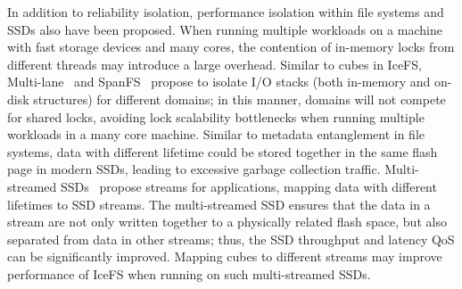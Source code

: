 In addition to reliability isolation, performance isolation within
file systems and SSDs also have been proposed. When running multiple
workloads on a machine with fast storage devices and many cores, the
contention of in-memory locks from different threads may introduce a
large overhead. Similar to cubes in IceFS,
Multi-lane~\cite{Kang14-multilane} and SpanFS~\cite{spanfs}  
propose to isolate I/O stacks (both in-memory and on-disk structures)
for different domains; in this manner, domains will not compete for
shared locks, avoiding lock scalability bottlenecks when running
multiple workloads in a many core machine.
Similar to metadata entanglement in file systems, data with different
lifetime could be stored together in the same flash page in modern
SSDs, leading to excessive garbage collection traffic. 
Multi-streamed SSDs~\cite{multi-stream} propose streams for
applications, mapping data with different lifetimes to SSD streams.
The multi-streamed SSD ensures that the data in a stream are not only
written together to a physically related flash space, but also
separated from data in other streams; thus, the SSD throughput and
latency QoS can be significantly improved. Mapping cubes to different
streams may improve performance of IceFS when running on such
multi-streamed SSDs. 
 



